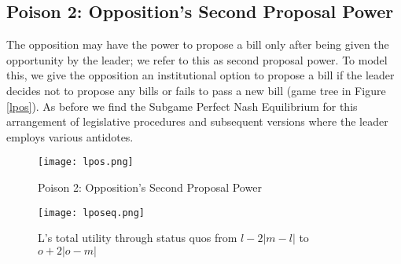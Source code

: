 \documentclass[12pt]{article}
\theoremstyle{plain}		      \newtheorem{assn}{Assumption}
\theoremstyle{plain}		      \newtheorem{prop}{Proposition}
\theoremstyle{plain}		      \newtheorem{lemma}{Lemma}
\theoremstyle{plain}	          \newtheorem{imp}{Implication}
\theoremstyle{plain}	          \newtheorem{hyp}{Hypothesis}
\theoremstyle{definition}		  \newtheorem{defn}{Definition}
\theoremstyle{remark}	          \newtheorem{rem}{Remark}
\theoremstyle{definition}         \newtheorem{case}{Case}
\begin{document}
\subsection{Poison 2: Opposition's Second Proposal Power}
\indent The opposition may have the power to propose a bill only after being given the opportunity by the leader; we refer to this as second proposal power. To model this, we give the opposition an institutional option to propose a bill if the leader decides not to propose any bills or fails to pass a new bill (game tree in Figure \ref{lpos}). As before we find the Subgame Perfect Nash Equilibrium for this arrangement of legislative procedures and subsequent versions where the leader employs various antidotes. 
\begin{figure}[h]
  \centering
  \begin{minipage}[b]{0.3\textwidth}
    \texttt{[image: lpos.png]}
    \caption{Poison 2: Opposition's Second Proposal Power}
    \label{lpos}
  \end{minipage}
  \hfill
  \begin{minipage}[b]{0.6\textwidth}
    \texttt{[image: lposeq.png]}
    \caption{L's total utility through status quos \newline from $l-2|m-l|$ to $o+2|o-m|$}
    \label{lposeq}
  \end{minipage}
\end{figure}
\FloatBarrier
\end{document}
